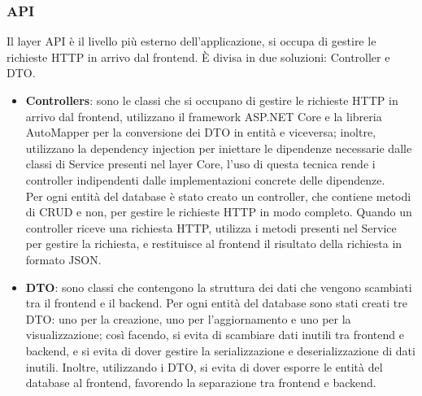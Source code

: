 \subsubsection{API}
Il layer API è il livello più esterno dell'applicazione, si occupa di gestire le richieste HTTP in arrivo dal frontend. È divisa in due soluzioni: Controller e DTO.\\
\begin{itemize}
    \item \textbf{Controllers}: sono le classi che si occupano di gestire le richieste HTTP in arrivo dal frontend, utilizzano il framework ASP.NET Core e la libreria AutoMapper per la conversione dei DTO in entità e viceversa; inoltre, utilizzano la dependency injection per iniettare le dipendenze necessarie dalle classi di Service presenti nel layer Core, l'uso di questa tecnica rende i controller indipendenti dalle implementazioni concrete delle dipendenze.\\
    Per ogni entità del database è stato creato un controller, che contiene metodi di \gls{CRUD} e non, per gestire le richieste HTTP in modo completo. Quando un controller riceve una richiesta HTTP, utilizza i metodi presenti nel Service per gestire la richiesta, e restituisce al frontend il risultato della richiesta in formato \gls{JSON}.\\
    \item \textbf{DTO}: sono classi che contengono la struttura dei dati che vengono scambiati tra il frontend e il backend.
    Per ogni entità del database sono stati creati tre DTO: uno per la creazione, uno per l'aggiornamento e uno per la visualizzazione; così facendo, si evita di scambiare dati inutili tra frontend e backend, e si evita di dover gestire la serializzazione e deserializzazione di dati inutili. Inoltre, utilizzando i DTO, si evita di dover esporre le entità del database al frontend, favorendo la separazione tra frontend e backend.\\
\end{itemize}
